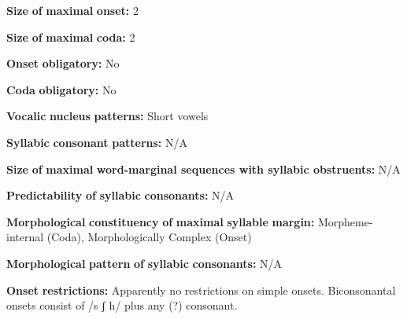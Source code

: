 \begin{styleBody}
\textbf{Size} \textbf{of} \textbf{maximal} \textbf{onset:} 2
\end{styleBody}

\begin{styleBody}
\textbf{Size} \textbf{of} \textbf{maximal} \textbf{coda:} 2
\end{styleBody}

\begin{styleBody}
\textbf{Onset} \textbf{obligatory:} No
\end{styleBody}

\begin{styleBody}
\textbf{Coda} \textbf{obligatory:} No
\end{styleBody}

\begin{styleBody}
\textbf{Vocalic} \textbf{nucleus} \textbf{patterns:} Short vowels
\end{styleBody}

\begin{styleBody}
\textbf{Syllabic} \textbf{consonant} \textbf{patterns:} N/A
\end{styleBody}

\begin{styleBody}
\textbf{Size} \textbf{of} \textbf{maximal} \textbf{word{}-marginal sequences with syllabic obstruents:} N/A
\end{styleBody}

\begin{styleBody}
\textbf{Predictability} \textbf{of} \textbf{syllabic} \textbf{consonants:} N/A
\end{styleBody}

\begin{styleBody}
\textbf{Morphological} \textbf{constituency} \textbf{of} \textbf{maximal} \textbf{syllable} \textbf{margin:} Morpheme-internal (Coda), Morphologically Complex (Onset)
\end{styleBody}

\begin{styleBody}
\textbf{Morphological} \textbf{pattern} \textbf{of} \textbf{syllabic} \textbf{consonants:} N/A
\end{styleBody}

\begin{styleBody}
\textbf{Onset} \textbf{restrictions:} Apparently no restrictions on simple onsets. Biconsonantal onsets consist of /s ʃ h/ plus any (?) consonant.
\end{styleBody}

